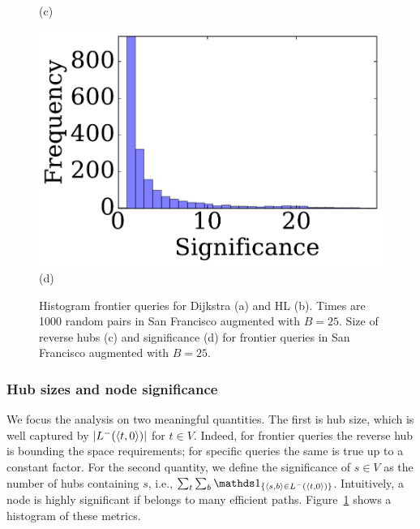 \documentclass[opre,nonblindrev]{informs3} %
\begin{document}
\begin{figure}[h]
\begin{minipage}[t]{.24\textwidth}
(c)
\end{minipage}%
\begin{minipage}[t]{.24\textwidth}
\centering
\includegraphics[clip, trim = 1.3cm 0.3cm 0cm 0cm,scale=0.225]{TexImg/significance.pdf}\\
(d)
\end{minipage}
\caption{ Histogram frontier queries for Dijkstra (a) and HL (b). Times are 1000 random pairs in San Francisco augmented with $B=25$.
Size of reverse hubs (c) and significance (d) for frontier queries in San Francisco augmented with $B=25$.
}
\label{fig:SF_query}
\label{fig:SF_bwd_size}
\end{figure}
	

\subsubsection{Hub sizes and node significance}

We focus the analysis on two meaningful quantities.
The first is hub size, which is well captured by  $\lvert L^-(\langle t,0\rangle)\rvert$ for $t\in V$.
Indeed, for frontier queries the reverse hub is bounding the space requirements; for specific queries the same is true up to a constant factor.
For the second quantity, we define the significance of $s\in V$ as the number of hubs containing $s$, i.e., $\sum_t\sum_b\In{\pp{s,b}\in \Lb(\pp{t,0})}$.
Intuitively, a node is highly significant if belongs to many efficient paths.
Figure~\ref{fig:SF_bwd_size} shows a histogram of these metrics. 
\end{document}
